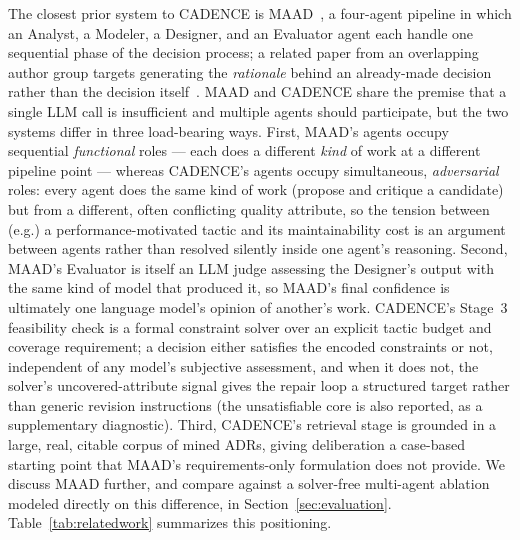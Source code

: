 \documentclass[preprint,12pt,authoryear]{elsarticle}
\renewcommand{\_}{\textunderscore\allowbreak{}}
\begin{document}
The closest prior system to CADENCE is MAAD~\citep{maad2025}, a four-agent pipeline in which an Analyst, a Modeler, a Designer, and an Evaluator agent each handle one sequential phase of the decision process; a related paper from an overlapping author group targets generating the \emph{rationale} behind an already-made decision rather than the decision itself~\citep{zhou2025rationale}. MAAD and CADENCE share the premise that a single LLM call is insufficient and multiple agents should participate, but the two systems differ in three load-bearing ways. First, MAAD's agents occupy sequential \emph{functional} roles --- each does a different \emph{kind} of work at a different pipeline point --- whereas CADENCE's agents occupy simultaneous, \emph{adversarial} roles: every agent does the same kind of work (propose and critique a candidate) but from a different, often conflicting quality attribute, so the tension between (e.g.) a performance-motivated tactic and its maintainability cost is an argument between agents rather than resolved silently inside one agent's reasoning. Second, MAAD's Evaluator is itself an LLM judge assessing the Designer's output with the same kind of model that produced it, so MAAD's final confidence is ultimately one language model's opinion of another's work. CADENCE's Stage~3 feasibility check is a formal constraint solver over an explicit tactic budget and coverage requirement; a decision either satisfies the encoded constraints or not, independent of any model's subjective assessment, and when it does not, the solver's uncovered-attribute signal gives the repair loop a structured target rather than generic revision instructions (the unsatisfiable core is also reported, as a supplementary diagnostic). Third, CADENCE's retrieval stage is grounded in a large, real, citable corpus of mined ADRs, giving deliberation a case-based starting point that MAAD's requirements-only formulation does not provide. We discuss MAAD further, and compare against a solver-free multi-agent ablation modeled directly on this difference, in Section~\ref{sec:evaluation}. Table~\ref{tab:relatedwork} summarizes this positioning.
\end{document}

